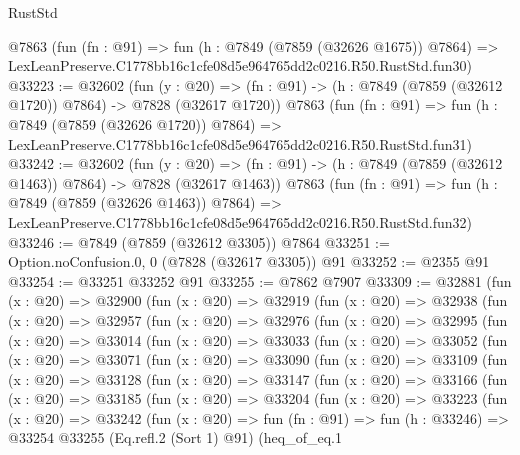 \begin{lexlean}{RustStd}
\begin{coremodule}
    @7863
    (fun (fn : @91) =>
    fun (h : @7849 (@7859 (@32626 @1675)) @7864) =>
    LexLeanPreserve.C1778bb16c1cfe08d5e964765dd2c0216.R50.RustStd.fun30)
@33223 := @32602
    (fun (y : @20) =>
    (fn : @91) -> (h : @7849 (@7859 (@32612 @1720)) @7864) -> @7828 (@32617 @1720))
    @7863
    (fun (fn : @91) =>
    fun (h : @7849 (@7859 (@32626 @1720)) @7864) =>
    LexLeanPreserve.C1778bb16c1cfe08d5e964765dd2c0216.R50.RustStd.fun31)
@33242 := @32602
    (fun (y : @20) =>
    (fn : @91) -> (h : @7849 (@7859 (@32612 @1463)) @7864) -> @7828 (@32617 @1463))
    @7863
    (fun (fn : @91) =>
    fun (h : @7849 (@7859 (@32626 @1463)) @7864) =>
    LexLeanPreserve.C1778bb16c1cfe08d5e964765dd2c0216.R50.RustStd.fun32)
@33246 := @7849 (@7859 (@32612 @3305)) @7864
@33251 := Option.noConfusion.{0, 0} (@7828 (@32617 @3305)) @91
@33252 := @2355 @91
@33254 := @33251 @33252 @91
@33255 := @7862 @7907
@33309 := @32881
    (fun (x : @20) =>
    @32900
      (fun (x : @20) =>
      @32919
        (fun (x : @20) =>
        @32938
          (fun (x : @20) =>
          @32957
            (fun (x : @20) =>
            @32976
              (fun (x : @20) =>
              @32995
                (fun (x : @20) =>
                @33014
                  (fun (x : @20) =>
                  @33033
                    (fun (x : @20) =>
                    @33052
                      (fun (x : @20) =>
                      @33071
                        (fun (x : @20) =>
                        @33090
                          (fun (x : @20) =>
                          @33109
                            (fun (x : @20) =>
                            @33128
                              (fun (x : @20) =>
                              @33147
                                (fun (x : @20) =>
                                @33166
                                  (fun (x : @20) =>
                                  @33185
                                    (fun (x : @20) =>
                                    @33204
                                      (fun (x : @20) =>
                                      @33223
                                        (fun (x : @20) =>
                                        @33242
                                          (fun (x : @20) =>
                                          fun (fn : @91) =>
                                          fun (h : @33246) =>
                                          @33254
                                            @33255
                                            (Eq.refl.{2} (Sort 1) @91)
                                            (heq_of_eq.{1}

\end{coremodule}
\end{lexlean}
